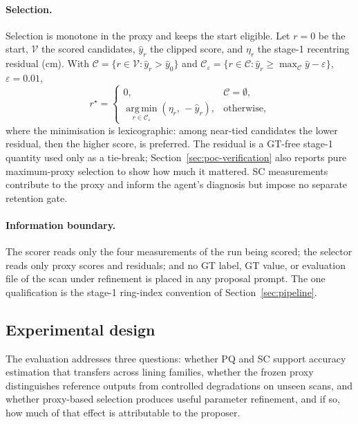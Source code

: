 \documentclass[a4paper,fleqn]{cas-dc}
\begin{document}
\paragraph{Selection.}
Selection is monotone in the proxy and keeps the start eligible. Let $r=0$ be the start, $\mathcal V$ the scored candidates, $\hat y_r$ the clipped score, and $\eta_r$ the stage-1 recentring residual (cm). With $\mathcal C=\{r\in\mathcal V:\hat y_r>\hat y_0\}$ and $\mathcal C_\varepsilon=\{r\in\mathcal C:\hat y_r\ge\max_{\mathcal C}\hat y-\varepsilon\}$, $\varepsilon=0.01$,
\begin{equation}
r^\star=
\begin{cases}
0, & \mathcal C=\emptyset,\\
\operatorname*{arg\,min}_{r\in\mathcal C_\varepsilon}(\eta_r,\,-\hat y_r), & \text{otherwise},
\end{cases}
\label{eq:refinement-selection}
\end{equation}
where the minimisation is lexicographic: among near-tied candidates the lower residual, then the higher score, is preferred. The residual is a GT-free stage-1 quantity used only as a tie-break; Section~\ref{sec:poc-verification} also reports pure maximum-proxy selection to show how much it mattered. SC measurements contribute to the proxy and inform the agent's diagnosis but impose no separate retention gate.

\paragraph{Information boundary.}
The scorer reads only the four measurements of the run being scored; the selector reads only proxy scores and residuals; and no GT label, GT value, or evaluation file of the scan under refinement is placed in any proposal prompt. The one qualification is the stage-1 ring-index convention of Section~\ref{sec:pipeline}.

\subsection{Experimental design}
\label{sec:exp-setup}

The evaluation addresses three questions: whether PQ and SC support accuracy estimation that transfers across lining families, whether the frozen proxy distinguishes reference outputs from controlled degradations on unseen scans, and whether proxy-based selection produces useful parameter refinement, and if so, how much of that effect is attributable to the proposer.
\end{document}
